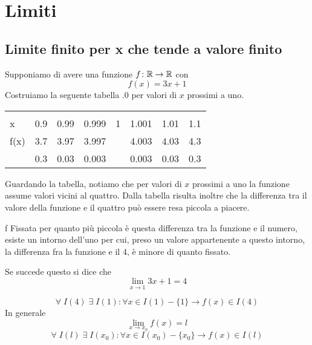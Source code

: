 \chapter{Limiti}
\section{Limite finito per x che tende a valore finito}
Supponiamo di avere una funzione $f\colon \mathbb{R}\to{}\mathbb{R}$ con \[f(x)=3x+1\] Costruiamo la seguente tabella .0 per valori di $x$ prossimi a uno.
\begin{center}
\begin{tabular}{@{}L*{7}{c}}
	\toprule
&&	&&\\
x	& 0.9 & 0.99 & 0.999&1 &1.001  &1.01  & 1.1 \\
\cmidrule(r){2-8} 
f(x)	&3.7  & 3.97 &3.997 & & 4.003 & 4.03 & 4.3 \\ 
\cmidrule(r){2-8} 
& 0.3 &0.03  &0.003  &  & 0.003 &0.03& 0.3 \\ 
\bottomrule
\end{tabular}
\end{center}
Guardando la tabella, notiamo che per valori di $x$ prossimi a uno la funzione assume valori vicini al  quattro. Dalla tabella risulta inoltre  che la differenza tra il valore della funzione e il quattro può essere resa piccola a piacere.\par f
Fissata per quanto più piccola è questa differenza  tra la funzione e il numero, esiste un intorno dell'uno per cui, preso un valore appartenente a questo intorno, la differenza fra la funzione e il 4,  è minore di quanto fissato. 

Se succede questo si dice che \[\lim_{x\to 1}3x+1=4 \]

\begin{equation*}
\forall\; I(4)\; \exists\; I(1) : \forall x\in I(1)-\lbrace 1\rbrace \longrightarrow f(x)\in I(4)
\end{equation*}
In generale \begin{equation*}
\lim_{x\to x_0}f(x)=l
\end{equation*}
\begin{equation*}
\forall\; I(l)\; \exists\; I(x_0) : \forall x\in I(x_0)-\lbrace x_0\rbrace \longrightarrow f(x)\in I(l)
\end{equation*}
